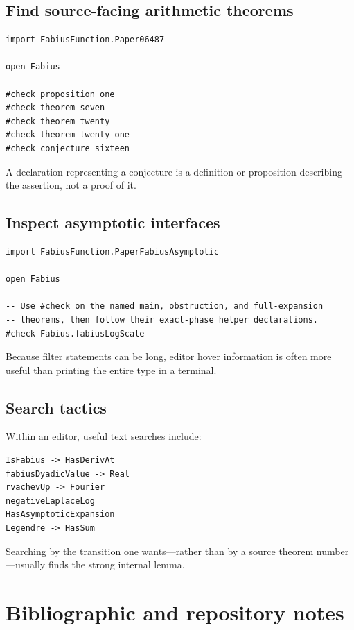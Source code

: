 \documentclass[11pt,oneside]{report}
\theoremstyle{definition}
\theoremstyle{remark}
\begin{document}
\section{Find source-facing arithmetic theorems}
\begin{lstlisting}
import FabiusFunction.Paper06487

open Fabius

#check proposition_one
#check theorem_seven
#check theorem_twenty
#check theorem_twenty_one
#check conjecture_sixteen
\end{lstlisting}
A declaration representing a conjecture is a definition or proposition describing the assertion, not a proof of it.

\section{Inspect asymptotic interfaces}
\begin{lstlisting}
import FabiusFunction.PaperFabiusAsymptotic

open Fabius

-- Use #check on the named main, obstruction, and full-expansion
-- theorems, then follow their exact-phase helper declarations.
#check Fabius.fabiusLogScale
\end{lstlisting}
Because filter statements can be long, editor hover information is often more useful than printing the entire type in a terminal.

\section{Search tactics}
Within an editor, useful text searches include:
\begin{lstlisting}
IsFabius -> HasDerivAt
fabiusDyadicValue -> Real
rvachevUp -> Fourier
negativeLaplaceLog
HasAsymptoticExpansion
Legendre -> HasSum
\end{lstlisting}
Searching by the transition one wants---rather than by a source theorem number---usually finds the strong internal lemma.

\chapter{Bibliographic and repository notes}
\end{document}
